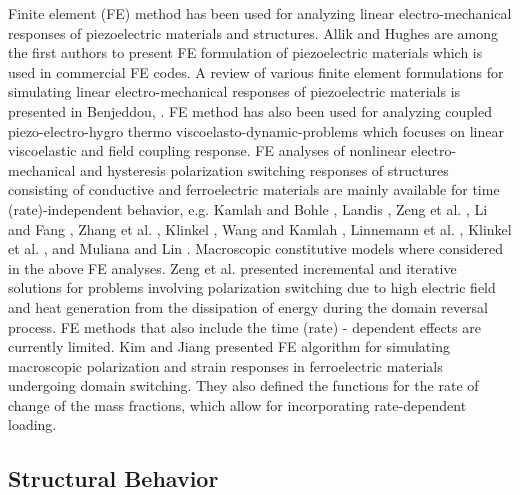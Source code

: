 Finite element (FE) method has been used for analyzing linear electro-mechanical responses of piezoelectric materials and structures. 
Allik and Hughes \cite{Allik1970} are among the first authors to present FE formulation of piezoelectric materials which is used in commercial FE codes. 
A review of various finite element formulations for simulating linear electro-mechanical responses of piezoelectric materials is presented in Benjeddou, \cite{Benjeddou2000}.
FE method has also been used for analyzing coupled  piezo-electro-hygro thermo viscoelasto-dynamic-problems \cite{Yi1999} which focuses on linear viscoelastic and field coupling response. 
FE analyses of nonlinear electro-mechanical and hysteresis polarization switching responses of structures consisting of conductive and ferroelectric materials are mainly available for time (rate)-independent behavior, e.g. Kamlah and Bohle \cite{Kamlah2001605}, Landis \cite{Landis2002}, Zeng et al. \cite{NME:NME556}, Li and Fang \cite{Li2004959}, Zhang et al. \cite{Zhang2005185}, Klinkel \cite{Klinkel20067197}, Wang and Kamlah \cite{0964-1726-18-10-104008}, Linnemann et al. \cite{Linnemann20091149}, Klinkel et al. \cite{Klinkel2006349}, and Muliana and Lin \cite{Muliana2011a}. 
Macroscopic constitutive models where considered in the above FE analyses.
Zeng et al. \cite{NME:NME556} presented incremental and iterative solutions for problems involving polarization switching due to high electric field and heat generation from the dissipation of energy during the domain reversal process. 
FE methods that also include the time (rate) - dependent effects are currently limited. 
Kim and Jiang \cite{Kim2002} presented FE algorithm for simulating macroscopic polarization and strain responses in ferroelectric materials undergoing domain switching. 
They also defined the functions for the rate of change of the mass fractions, which allow for incorporating rate-dependent loading.
\\

\subsection{Structural Behavior}


